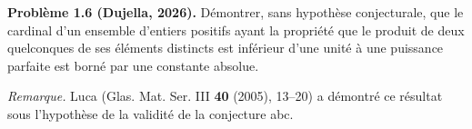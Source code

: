 \textbf{Problème 1.6 (Dujella, 2026).} Démontrer, sans hypothèse conjecturale, que le cardinal d'un ensemble d'entiers positifs ayant la propriété que le produit de deux quelconques de ses éléments distincts est inférieur d'une unité à une puissance parfaite est borné par une constante absolue.

\medskip

\textit{Remarque.} Luca (Glas. Mat. Ser. III \textbf{40} (2005), 13--20) a démontré ce résultat sous l'hypothèse de la validité de la conjecture abc.
